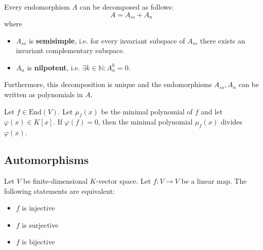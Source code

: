 	\begin{property}\label{linalgebra:jordan_chevalley}
		Every endomorphism $A$ can be decomposed as follows:
		\begin{equation}
			A = A_{ss} + A_n
		\end{equation}
		where
		\begin{itemize}
			\item $A_{ss}$ is \textbf{semisimple}, i.e. for every invariant subspace of $A_{ss}$ there exists an invariant complementary subspace.
			\item $A_n$ is \textbf{nilpotent}, i.e. $\exists k\in\mathbb{N}: A_n^k = 0$.
		\end{itemize}
		Furthermore, this decomposition is unique and the endomorphisms $A_{ss}, A_n$ can be written as polynomials in $A$.
	\end{property}
    
	\begin{property}\label{linalgebra:minimal_polynomial_divisor}
		Let $f\in\text{End}(V)$. Let $\mu_f(x)$ be the minimal polynomial of $f$ and let $\varphi(x)\in K[x]$. If $\varphi(f) = 0$, then the minimal polynomial $\mu_f(x)$ divides $\varphi(x)$. 
	\end{property}
	
\subsection{Automorphisms}

	\begin{property}
		Let $V$ be finite-dimensional $K$-vector space. Let $f:V\rightarrow V$ be a linear map. The following statements are equivalent:
        	\begin{itemize}
            		\item $f$ is injective
			\item $f$ is surjective
                	\item $f$ is bijective
		\end{itemize}
	\end{property}

